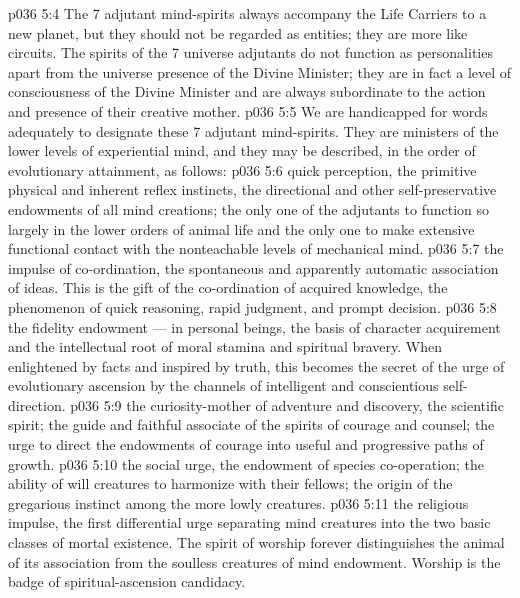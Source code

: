 \vs p036 5:4 \pc The 7 adjutant mind\hyp{}spirits always accompany the Life Carriers to a new planet, but they should not be regarded as entities; they are more like circuits. The spirits of the 7 universe adjutants do not function as personalities apart from the universe presence of the Divine Minister; they are in fact a level of consciousness of the Divine Minister and are always subordinate to the action and presence of their creative mother.
\vs p036 5:5 We are handicapped for words adequately to designate these 7 adjutant mind\hyp{}spirits. They are ministers of the lower levels of experiential mind, and they may be described, in the order of evolutionary attainment, as follows:
\vs p036 5:6 \bibnobreakspace {} quick perception, the primitive physical and inherent reflex instincts, the directional and other self\hyp{}preservative endowments of all mind creations; the only one of the adjutants to function so largely in the lower orders of animal life and the only one to make extensive functional contact with the nonteachable levels of mechanical mind.
\vs p036 5:7 \bibnobreakspace {} the impulse of co\hyp{}ordination, the spontaneous and apparently automatic association of ideas. This is the gift of the co\hyp{}ordination of acquired knowledge, the phenomenon of quick reasoning, rapid judgment, and prompt decision.
\vs p036 5:8 \bibnobreakspace {} the fidelity endowment --- in personal beings, the basis of character acquirement and the intellectual root of moral stamina and spiritual bravery. When enlightened by facts and inspired by truth, this becomes the secret of the urge of evolutionary ascension by the channels of intelligent and conscientious self\hyp{}direction.
\vs p036 5:9 \bibnobreakspace {} the curiosity\hyp{}mother of adventure and discovery, the scientific spirit; the guide and faithful associate of the spirits of courage and counsel; the urge to direct the endowments of courage into useful and progressive paths of growth.
\vs p036 5:10 \bibnobreakspace {} the social urge, the endowment of species co\hyp{}operation; the ability of will creatures to harmonize with their fellows; the origin of the gregarious instinct among the more lowly creatures.
\vs p036 5:11 \bibnobreakspace {} the religious impulse, the first differential urge separating mind creatures into the two basic classes of mortal existence. The spirit of worship forever distinguishes the animal of its association from the soulless creatures of mind endowment. Worship is the badge of spiritual\hyp{}ascension candidacy.
